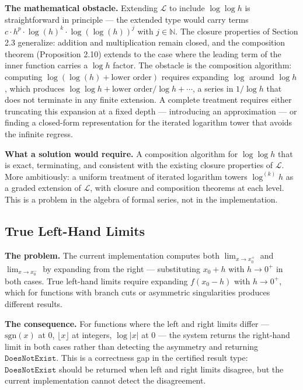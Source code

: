 \documentclass[12pt]{article}
\begin{document}
\textbf{The mathematical obstacle.} Extending \(\mathcal{L}\) to include
\(\log \log h\) is straightforward in principle --- the extended type
would carry terms \(c \cdot h^p \cdot \log(h)^k \cdot \log(\log(h))^j\)
with \(j \in \mathbb{N}\). The closure properties of Section 2.3
generalize: addition and multiplication remain closed, and the
composition theorem (Proposition 2.10) extends to the case where the
leading term of the inner function carries a \(\log h\) factor. The
obstacle is the composition algorithm: computing
\(\log(\log(h) + \text{lower order})\) requires expanding \(\log\)
around \(\log h\), which produces
\(\log \log h + \text{lower order} / \log h + \cdots\), a series in
\(1/\log h\) that does not terminate in any finite extension. A complete
treatment requires either truncating this expansion at a fixed depth ---
introducing an approximation --- or finding a closed-form representation
for the iterated logarithm tower that avoids the infinite regress.

\textbf{What a solution would require.} A composition algorithm for
\(\log \log h\) that is exact, terminating, and consistent with the
existing closure properties of \(\mathcal{L}\). More ambitiously: a
uniform treatment of iterated logarithm towers \(\log^{(k)} h\) as a
graded extension of \(\mathcal{L}\), with closure and composition
theorems at each level. This is a problem in the algebra of formal
series, not in the implementation.




\subsection{True Left-Hand Limits}\label{true-left-hand-limits}

\textbf{The problem.} The current implementation computes both
\(\lim_{x \to x_0^+}\) and \(\lim_{x \to x_0^-}\) by expanding from the
right --- substituting \(x_0 + h\) with \(h \to 0^+\) in both cases.
True left-hand limits require expanding \(f(x_0 - h)\) with
\(h \to 0^+\), which for functions with branch cuts or asymmetric
singularities produces different results.

\textbf{The consequence.} For functions where the left and right limits
differ --- \(\mathrm{sgn}(x)\) at \(0\), \(\lfloor x \rfloor\) at
integers, \(\log|x|\) at \(0\) --- the system returns the right-hand
limit in both cases rather than detecting the asymmetry and returning
\(\mathtt{DoesNotExist}\). This is a correctness gap in the certified
result type: \(\mathtt{DoesNotExist}\) should be returned when left and
right limits disagree, but the current implementation cannot detect the
disagreement.
\end{document}
